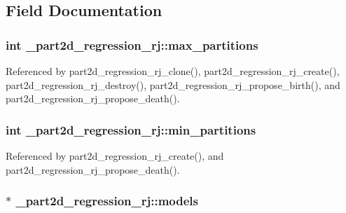 \subsection{Field Documentation}
\subsubsection[{\texorpdfstring{max\+\_\+partitions}{max_partitions}}]{\setlength{\rightskip}{0pt plus 5cm}int \+\_\+part2d\+\_\+regression\+\_\+rj\+::max\+\_\+partitions}\hypertarget{struct__part2d__regression__rj_a749af75f5b6ebfdc9853b0f5a36f4d62}{}\label{struct__part2d__regression__rj_a749af75f5b6ebfdc9853b0f5a36f4d62}


Referenced by part2d\+\_\+regression\+\_\+rj\+\_\+clone(), part2d\+\_\+regression\+\_\+rj\+\_\+create(), part2d\+\_\+regression\+\_\+rj\+\_\+destroy(), part2d\+\_\+regression\+\_\+rj\+\_\+propose\+\_\+birth(), and part2d\+\_\+regression\+\_\+rj\+\_\+propose\+\_\+death().

\subsubsection[{\texorpdfstring{min\+\_\+partitions}{min_partitions}}]{\setlength{\rightskip}{0pt plus 5cm}int \+\_\+part2d\+\_\+regression\+\_\+rj\+::min\+\_\+partitions}\hypertarget{struct__part2d__regression__rj_a14cd1c40f5df738d51d6fe75e4d0f1d2}{}\label{struct__part2d__regression__rj_a14cd1c40f5df738d51d6fe75e4d0f1d2}


Referenced by part2d\+\_\+regression\+\_\+rj\+\_\+create(), and part2d\+\_\+regression\+\_\+rj\+\_\+propose\+\_\+death().

\subsubsection[{\texorpdfstring{models}{models}}]{$\ast$ \+\_\+part2d\+\_\+regression\+\_\+rj\+::models}\hypertarget{struct__part2d__regression__rj_addaee14f78c7019e13b543eacf986643}{}\label{struct__part2d__regression__rj_addaee14f78c7019e13b543eacf986643}


